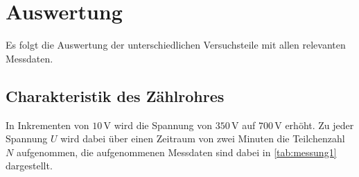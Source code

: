 \section{Auswertung}
\label{sec:auswertung}

Es folgt die Auswertung der unterschiedlichen
Versuchsteile mit allen relevanten Messdaten.

\subsection{Charakteristik des Zählrohres}
\label{subsec:charakteristik}

In Inkrementen von $10 \,\unit{\volt}$ wird die Spannung von $350 \,\unit{\volt}$ auf $700 \,\unit{\volt}$ erhöht.
Zu jeder Spannung $U$ wird dabei über einen Zeitraum von zwei Minuten die Teilchenzahl $N$ aufgenommen, die aufgenommenen Messdaten sind dabei in \autoref{tab:messung1} dargestellt.

